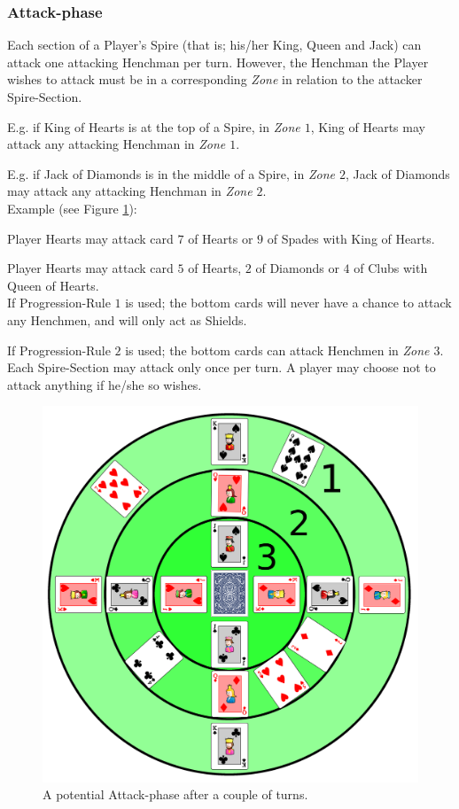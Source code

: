 \documentclass[11pt,twocolumn]{article}
\begin{document}
\subsubsection{Attack-phase}
\label{sec:playingshufflespires_attackphase}
Each section of a Player's Spire (that is; his/her King, Queen and Jack) can attack one attacking Henchman per turn.
However, the Henchman the Player wishes to attack must be in a corresponding \textit{Zone} in relation to the attacker Spire-Section.

E.g. if King of Hearts is at the top of a Spire, in \textit{Zone $1$}, King of Hearts may attack any attacking Henchman in \textit{Zone $1$}.

E.g. if Jack of Diamonds is in the middle of a Spire, in \textit{Zone $2$}, Jack of Diamonds may attack any attacking Henchman in \textit{Zone $2$}.\\

\noindent
Example (see Figure \ref{fig:attack}):

Player Hearts may attack card $7$ of Hearts or $9$ of Spades with King of Hearts.

Player Hearts may attack card $5$ of Hearts, $2$ of Diamonds or $4$ of Clubs with Queen of Hearts.\\

\noindent
If Progression-Rule $1$ is used; the bottom cards will never have a chance to attack any Henchmen, and will only act as Shields.

If Progression-Rule $2$ is used; the bottom cards can attack Henchmen in \textit{Zone $3$}. \\

\noindent
Each Spire-Section may attack only once per turn. A player may choose not to attack anything if he/she so wishes.

\begin{figure}[h!]
\centering
\includegraphics[width=\linewidth]{attack.png}
\caption{A potential Attack-phase after a couple of turns.}
\label{fig:attack}
\end{figure}
\end{document}
